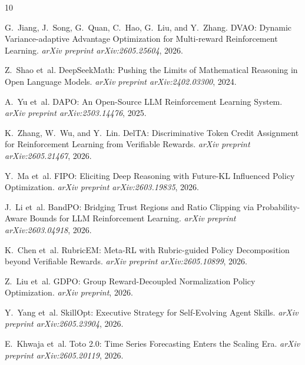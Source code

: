 \documentclass[11pt,a4paper]{article}
\begin{document}

\begin{thebibliography}{10}

G.~Jiang, J.~Song, G.~Quan, C.~Hao, G.~Liu, and Y.~Zhang.
\newblock DVAO: Dynamic Variance-adaptive Advantage Optimization for Multi-reward Reinforcement Learning.
\newblock \emph{arXiv preprint arXiv:2605.25604}, 2026.

Z.~Shao et~al.
\newblock DeepSeekMath: Pushing the Limits of Mathematical Reasoning in Open Language Models.
\newblock \emph{arXiv preprint arXiv:2402.03300}, 2024.

A.~Yu et~al.
\newblock DAPO: An Open-Source LLM Reinforcement Learning System.
\newblock \emph{arXiv preprint arXiv:2503.14476}, 2025.

K.~Zhang, W.~Wu, and Y.~Lin.
\newblock DelTA: Discriminative Token Credit Assignment for Reinforcement Learning from Verifiable Rewards.
\newblock \emph{arXiv preprint arXiv:2605.21467}, 2026.

Y.~Ma et~al.
\newblock FIPO: Eliciting Deep Reasoning with Future-KL Influenced Policy Optimization.
\newblock \emph{arXiv preprint arXiv:2603.19835}, 2026.

J.~Li et~al.
\newblock BandPO: Bridging Trust Regions and Ratio Clipping via Probability-Aware Bounds for LLM Reinforcement Learning.
\newblock \emph{arXiv preprint arXiv:2603.04918}, 2026.

K.~Chen et~al.
\newblock RubricEM: Meta-RL with Rubric-guided Policy Decomposition beyond Verifiable Rewards.
\newblock \emph{arXiv preprint arXiv:2605.10899}, 2026.

Z.~Liu et~al.
\newblock GDPO: Group Reward-Decoupled Normalization Policy Optimization.
\newblock \emph{arXiv preprint}, 2026.

Y.~Yang et~al.
\newblock SkillOpt: Executive Strategy for Self-Evolving Agent Skills.
\newblock \emph{arXiv preprint arXiv:2605.23904}, 2026.

E.~Khwaja et~al.
\newblock Toto 2.0: Time Series Forecasting Enters the Scaling Era.
\newblock \emph{arXiv preprint arXiv:2605.20119}, 2026.

\end{thebibliography}
\end{document}
